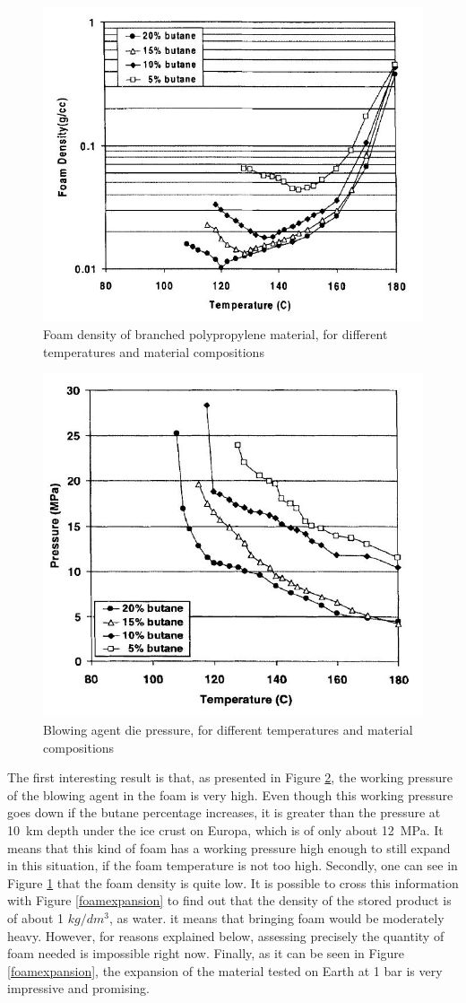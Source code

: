 \begin{figure}[htb]
\centering
\includegraphics[width=.48\textwidth]{figures/Paul/foamdensity}
\caption{Foam density of branched polypropylene material, for different temperatures and material compositions}
\label{foamdensity}
\end{figure}

\begin{figure}[htb]
\centering
\includegraphics[width=.48\textwidth]{figures/Paul/foampressure}
\caption{Blowing agent die pressure, for different temperatures and material compositions}
\label{foampressure}
\end{figure}

The first interesting result is that, as presented in Figure \ref{foampressure}, the working pressure of the blowing agent in the foam is very high. Even though this working pressure goes down if the butane percentage increases, it is greater than the pressure at 10~km depth under the ice crust on Europa, which is of only about 12~MPa. It means that this kind of foam has a working pressure high enough to still expand in this situation, if the foam temperature is not too high.
Secondly, one can see in Figure \ref{foamdensity} that the foam density is quite low. It is possible to cross this information with Figure \ref{foamexpansion} to find out that the density of the stored product is of about 1 $kg/dm^{3}$, as water. it means that bringing foam would be moderately heavy. However, for reasons explained below, assessing precisely the quantity of foam needed is impossible right now. Finally, as it can be seen in Figure \ref{foamexpansion}, the expansion of the material tested on Earth at 1 bar is very impressive and promising.

